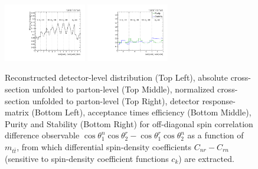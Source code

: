 \begin{figure}[htb]
\begin{center}
 \includegraphics[width=0.32\textwidth]{fig_fullRun2UL/unfolding/combined/TotEff_c_Mnr_mttbar.pdf}
 \includegraphics[width=0.32\textwidth]{fig_fullRun2UL/unfolding/combined/PurStab_c_Mnr_mttbar.pdf} \\
\caption{Reconstructed detector-level distribution (Top Left), absolute cross-section unfolded to parton-level (Top Middle), normalized cross-section unfolded to parton-level (Top Right), detector response-matrix (Bottom Left), acceptance times efficiency (Bottom Middle), Purity and Stability (Bottom Right) for off-diagonal spin correlation difference observable $\cos\theta_{1}^{n}\cos\theta_{2}^{r}-\cos\theta_{1}^{r}\cos\theta_{2}^{n}$ as a function of $m_{t\bar{t}}$, from which differential spin-density coefficients $C_{nr}-C_{rn}$ (sensitive to spin-density coefficient functions $c_k$) are extracted.}
\label{fig:c_Mnr_mttbar}
\end{center}
\end{figure}
\clearpage
